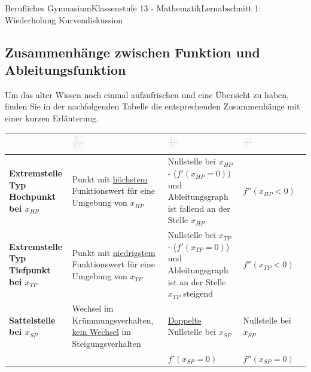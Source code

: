 \documentclass[11pt,twocolumn,oneside,openany,headings=optiontotoc,11pt,numbers=noenddot]{article}
\begin{document}
\begin{worksheet}{Berufliches Gymnasium}{Klassenstufe 13 - Mathematik}{Lernabschnitt 1: Wiederholung Kurvendiskussion}
		\subsection{Zusammenhänge zwischen Funktion und Ableitungsfunktion}
		Um das alter Wissen noch einmal aufzufrischen und eine Übersicht zu haben, finden Sie in der nachfolgenden Tabelle die entsprechenden Zusammenhänge mit einer kurzen Erläuterung.\\
		\newpage
		\setlength{\columnseprule}{0pt}
		\begin{tabularx}{\textwidth}{|X|X|X|X|}
			\multicolumn{1}{X|}{}& \includegraphics[width=0.15\textwidth]{../99_Bilder/Bsp.png} & \includegraphics[width=0.15\textwidth]{../99_Bilder/Bsp'.png} & \includegraphics[width=0.15\textwidth]{../99_Bilder/Bsp''.png}\\
			\hline
			\hline
			\textbf{Extremstelle Typ Hochpunkt bei \(x_{HP}\)} & Punkt mit \underline{höchstem} Funktionswert für eine Umgebung von \(x_{HP}\) & Nullstelle bei \(x_{HP}\) - (\(f'(x_{HP} = 0)\)) und Ableitungsgraph ist fallend an der Stelle \(x_{HP}\) & \(f''(x_{HP} < 0)\)\\
			\hline
			\textbf{Extremstelle Typ Tiefpunkt bei \(x_{TP}\)} & Punkt mit \underline{niedrigstem} Funktionswert für eine Umgebung von \(x_{TP}\) & Nullstelle bei \(x_{TP}\) - (\(f'(x_{TP} = 0)\)) und Ableitungsgraph ist an der Stelle \(x_{TP}\) steigend & \(f''(x_{TP} < 0)\)\\
			\hline
			\textbf{Sattelstelle bei \(x_{SP}\)} & Wechsel im Krümmungsverhalten, \underline{kein Wechsel} im Steigungsverhalten & \underline{Doppelte} Nullstelle bei \(x_{SP}\) & Nullstelle bei \(x_{SP}\)\\
			& & \(f'(x_{SP} = 0)\) & \(f''(x_{SP} = 0)\)\\

\end{tabularx}
\end{worksheet}
\end{document}
